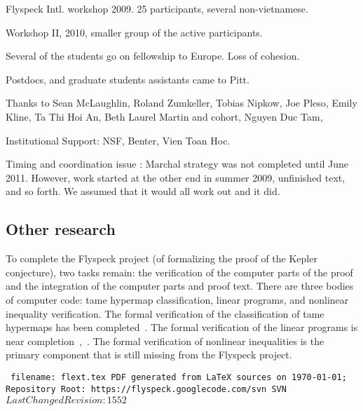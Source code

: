 \documentclass{llncs}
\def\svninfo{{\tt
  filename: flext.tex\hfill\break
  PDF generated from LaTeX sources on \today; \hfill\break
  Repository Root: https://flyspeck.googlecode.com/svn \hfill\break
  SVN $LastChangedRevision: 1552 $
  }
  }
\begin{document}
Flyspeck Intl. workshop 2009. 25 participants, several non-vietnamese.

Workshop II, 2010, smaller group of the active participants.

Several of the students go on fellowship to Europe. Loss of cohesion.

Postdocs, and graduate students assistants came to Pitt.



Thanks to Sean McLaughlin, Roland Zumkeller, Tobias Nipkow, Joe Pleso,
Emily Kline, Ta Thi Hoi An, Beth Laurel Martin and cohort, Nguyen Duc Tam,

Institutional Support: NSF, Benter, Vien Toan Hoc.

Timing and coordination 
issue : Marchal strategy was not completed until June 2011. However,
work started at the other end in summer 2009, unfinished text, and so forth.
We assumed that it would all work out and it did.


\subsection{Other research}

To complete the Flyspeck project (of formalizing the proof of the
Kepler conjecture), two tasks remain: the verification of the computer
parts of the proof and the integration of the computer parts and proof
text.  There are three bodies of computer code: tame hypermap
classification, linear programs, and nonlinear inequality
verification.  The formal verification of the classification of tame
hypermaps has been completed~\cite{XX}.  The formal verification of
the linear programs is near completion~\cite{XX},~\cite{XX}.  The
formal verification of nonlinear inequalities is the primary component
that is still missing from the Flyspeck project.

\bigskip
\noindent
\svninfo
\end{document}
